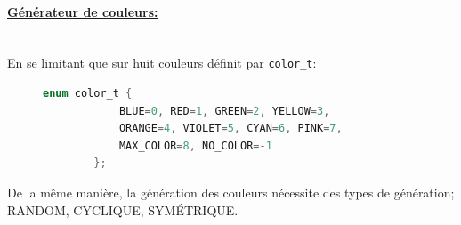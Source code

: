 \documentclass[11pt]{article}
\begin{document}
\paragraph{\underline{Générateur de couleurs:}\\\\}
En se limitant que sur huit couleurs définit par \texttt{color\_t}:  \\
\begin{figure}[h!]
    \centering
    \begin{lstlisting}[language=C]
        enum color_t {
            BLUE=0, RED=1, GREEN=2, YELLOW=3,
            ORANGE=4, VIOLET=5, CYAN=6, PINK=7,
            MAX_COLOR=8, NO_COLOR=-1
        };
    \end{lstlisting}
\end{figure}
\newline
De la même manière, la génération des couleurs nécessite des types de génération; RANDOM, CYCLIQUE, SYMÉTRIQUE.\\  
\end{document}
